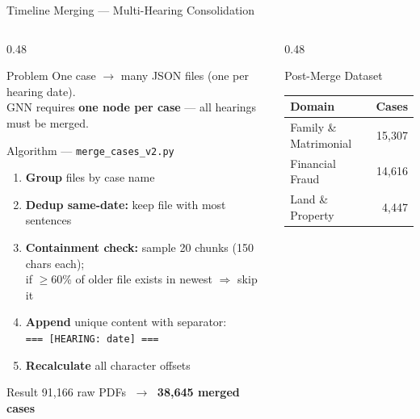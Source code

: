 \documentclass[aspectratio=169, 9pt]{beamer}
\begin{document}
\begin{frame}{Timeline Merging — Multi-Hearing Consolidation}
  \begin{columns}[T]
    \begin{column}{0.48\textwidth}
      \begin{block}{Problem}
        \small One case $\to$ many JSON files (one per hearing date).\\
        GNN requires \textbf{one node per case} — all hearings must be merged.
      \end{block}
      \vspace{5pt}
      \begin{block}{Algorithm — \texttt{merge\_cases\_v2.py}}
        \small
        \begin{enumerate}\setlength\itemsep{2pt}
          \item \textbf{Group} files by case name
          \item \textbf{Dedup same-date:} keep file with most sentences
          \item \textbf{Containment check:} sample 20 chunks (150 chars each);\\
                if $\geq$60\% of older file exists in newest $\Rightarrow$ skip it
          \item \textbf{Append} unique content with separator:\\
                {\scriptsize\texttt{=== [HEARING: date] ===}}
          \item \textbf{Recalculate} all character offsets
        \end{enumerate}
      \end{block}
      \vspace{5pt}
      \begin{alertblock}{Result}
        \small 91,166 raw PDFs $\;\longrightarrow\;$ \textbf{38,645 merged cases}
      \end{alertblock}
    \end{column}
    \begin{column}{0.48\textwidth}
      \begin{block}{Post-Merge Dataset}
        \scriptsize\renewcommand{\arraystretch}{1.2}
        \begin{tabular}{lr}
          \toprule
          \textbf{Domain} & \textbf{Cases}\\
          \midrule
          Family \& Matrimonial & 15,307\\
          Financial Fraud       & 14,616\\
          Land \& Property      &  4,447\\

\end{tabular}
\end{block}
\end{column}
\end{columns}
\end{frame}
\end{document}

